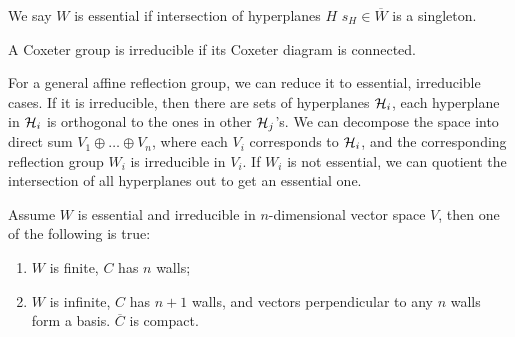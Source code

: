 \documentclass[../main.tex]{subfiles}
\begin{document}
\begin{definition}
    We say $W$ is essential if intersection of hyperplanes $H$ $s_H \in \overline W$ is a singleton.
\end{definition}

\begin{definition}
    A Coxeter group is irreducible if its Coxeter diagram is connected.
\end{definition}

For a general affine reflection group, we can reduce it to essential, irreducible cases. If it is irreducible, then there are sets of hyperplanes $\mathcal{H}_i$, each hyperplane in $\mathcal{H}_i$ is orthogonal to the ones in other $\mathcal{H}_j$'s. We can decompose the space into direct sum $V_1 \oplus \dots \oplus V_n$, where each $V_i$ corresponds to $\mathcal{H}_i$, and the corresponding reflection group $W_i$ is irreducible in $V_i$. If $W_i$ is not essential, we can quotient the intersection of all hyperplanes out to get an essential one.

\begin{theorem}\label{thm:indep}
    Assume $W$ is essential and irreducible in $n$-dimensional vector space $V$, then one of the following is true:\begin{enumerate}
        \item $W$ is finite, $C$ has $n$ walls;
        \item $W$ is infinite, $C$ has $n+1$ walls, and vectors perpendicular to any $n$ walls form a basis. $\overline C$ is compact.
    \end{enumerate}
\end{theorem}
\end{document}
